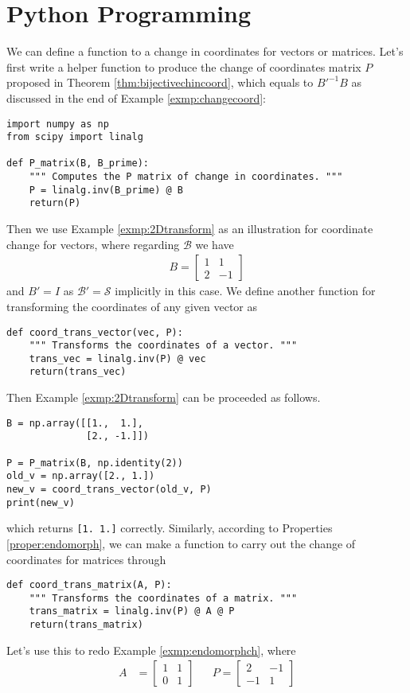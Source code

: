 \section{Python Programming}
We can define a function to a change in coordinates for vectors or matrices. Let's first write a helper function to produce the change of coordinates matrix $P$ proposed in Theorem \ref{thm:bijectivechincoord}, which equals to $B'^{-1}B$ as discussed in the end of Example \ref{exmp:changecoord}:
\begin{lstlisting}
import numpy as np
from scipy import linalg

def P_matrix(B, B_prime):
    """ Computes the P matrix of change in coordinates. """
    P = linalg.inv(B_prime) @ B
    return(P)
\end{lstlisting}
Then we use Example \ref{exmp:2Dtransform} as an illustration for coordinate change for vectors, where regarding $\mathcal{B}$ we have
\begin{align*}
B = 
\begin{bmatrix}
1 & 1 \\ 
2 & -1
\end{bmatrix}
\end{align*}
and $B' = I$ as $\mathcal{B}' = \mathcal{S}$ implicitly in this case. We define another function for transforming the coordinates of any given vector as
\begin{lstlisting}
def coord_trans_vector(vec, P):
    """ Transforms the coordinates of a vector. """
    trans_vec = linalg.inv(P) @ vec
    return(trans_vec)    
\end{lstlisting}
Then Example \ref{exmp:2Dtransform} can be proceeded as follows.
\begin{lstlisting}
B = np.array([[1.,  1.], 
              [2., -1.]])

P = P_matrix(B, np.identity(2))
old_v = np.array([2., 1.])
new_v = coord_trans_vector(old_v, P)
print(new_v)    
\end{lstlisting}
which returns \verb|[1. 1.]| correctly. Similarly, according to Properties \ref{proper:endomorph}, we can make a function to carry out the change of coordinates for matrices through
\begin{lstlisting}
def coord_trans_matrix(A, P):
    """ Transforms the coordinates of a matrix. """
    trans_matrix = linalg.inv(P) @ A @ P
    return(trans_matrix)    
\end{lstlisting}
Let's use this to redo Example \ref{exmp:endomorphch}, where
\begin{align*}
A &= 
\begin{bmatrix}
1 & 1 \\
0 & 1
\end{bmatrix} &
& P=
\begin{bmatrix}
2 & -1 \\
-1 & 1
\end{bmatrix}
\end{align*}
